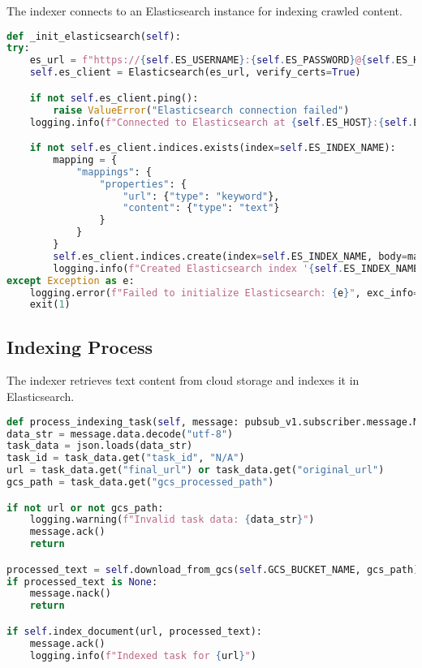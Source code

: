 \documentclass[12pt,a4paper]{report}
\begin{document}
The indexer connects to an Elasticsearch instance for indexing crawled content.
\begin{lstlisting}[language=Python]
def _init_elasticsearch(self):
try:
    es_url = f"https://{self.ES_USERNAME}:{self.ES_PASSWORD}@{self.ES_HOST}"
    self.es_client = Elasticsearch(es_url, verify_certs=True)

    if not self.es_client.ping():
        raise ValueError("Elasticsearch connection failed")
    logging.info(f"Connected to Elasticsearch at {self.ES_HOST}:{self.ES_PORT}")

    if not self.es_client.indices.exists(index=self.ES_INDEX_NAME):
        mapping = {
            "mappings": {
                "properties": {
                    "url": {"type": "keyword"},
                    "content": {"type": "text"}
                }
            }
        }
        self.es_client.indices.create(index=self.ES_INDEX_NAME, body=mapping)
        logging.info(f"Created Elasticsearch index '{self.ES_INDEX_NAME}'")
except Exception as e:
    logging.error(f"Failed to initialize Elasticsearch: {e}", exc_info=True)
    exit(1)
\end{lstlisting}

\subsection{Indexing Process}
The indexer retrieves text content from cloud storage and indexes it in Elasticsearch.
\begin{lstlisting}[language=Python]
def process_indexing_task(self, message: pubsub_v1.subscriber.message.Message):
data_str = message.data.decode("utf-8")
task_data = json.loads(data_str)
task_id = task_data.get("task_id", "N/A")
url = task_data.get("final_url") or task_data.get("original_url")
gcs_path = task_data.get("gcs_processed_path")

if not url or not gcs_path:
    logging.warning(f"Invalid task data: {data_str}")
    message.ack()
    return

processed_text = self.download_from_gcs(self.GCS_BUCKET_NAME, gcs_path)
if processed_text is None:
    message.nack()
    return

if self.index_document(url, processed_text):
    message.ack()
    logging.info(f"Indexed task for {url}")
\end{lstlisting}
\newpage
\end{document}
